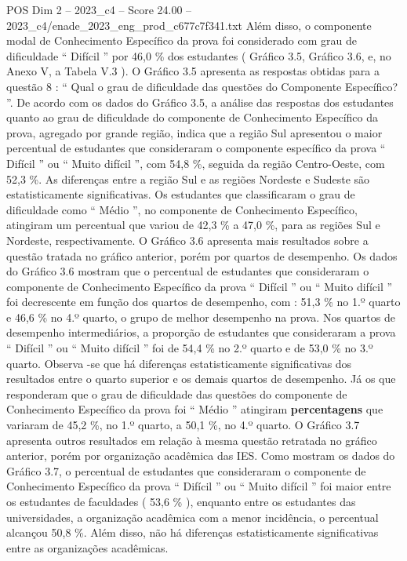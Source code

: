 \begin{textsample}{POS Dim 2 – 2023\_c4 – Score 24.00 – 2023\_c4/enade\_2023\_eng\_prod\_c677c7f341.txt}
Além disso, o componente modal de Conhecimento Específico da prova foi considerado com grau de dificuldade “ Difícil ” por 46,0 \% dos estudantes ( Gráfico 3.5, Gráfico 3.6, e, no Anexo V, a Tabela V.3 ).
O Gráfico 3.5 apresenta as respostas obtidas para a questão 8 : “ Qual o grau de dificuldade das questões do Componente Específico? ”.
De acordo com os dados do Gráfico 3.5, a análise das respostas dos estudantes quanto ao grau de dificuldade do componente de Conhecimento Específico da prova, agregado por grande região, indica que a região Sul apresentou o maior percentual de estudantes que consideraram o componente específico da prova “ Difícil ” ou “ Muito difícil ”, com 54,8 \%, seguida da região Centro-Oeste, com 52,3 \%.
As diferenças entre a região Sul e as regiões Nordeste e Sudeste são estatisticamente significativas.
Os estudantes que classificaram o grau de dificuldade como “ Médio ”, no componente de Conhecimento Específico, atingiram um percentual que variou de 42,3 \% a 47,0 \%, para as regiões Sul e Nordeste, respectivamente.
O Gráfico 3.6 apresenta mais resultados sobre a questão tratada no gráfico anterior, porém por quartos de desempenho.
Os dados do Gráfico 3.6 mostram que o percentual de estudantes que consideraram o componente de Conhecimento Específico da prova “ Difícil ” ou “ Muito difícil ” foi decrescente em função dos quartos de desempenho, com : 51,3 \% no 1.º quarto e 46,6 \% no 4.º quarto, o grupo de melhor desempenho na prova.
Nos quartos de desempenho intermediários, a proporção de estudantes que consideraram a prova “ Difícil ” ou “ Muito difícil ” foi de 54,4 \% no 2.º quarto e de 53,0 \% no 3.º quarto.
Observa -se que há diferenças estatisticamente significativas dos resultados entre o quarto superior e os demais quartos de desempenho.
Já os que responderam que o grau de dificuldade das questões do componente de Conhecimento Específico da prova foi “ Médio ” atingiram \textbf{percentagens} que variaram de 45,2 \%, no 1.º quarto, a 50,1 \%, no 4.º quarto.
O Gráfico 3.7 apresenta outros resultados em relação à mesma questão retratada no gráfico anterior, porém por organização acadêmica das IES.
Como mostram os dados do Gráfico 3.7, o percentual de estudantes que consideraram o componente de Conhecimento Específico da prova “ Difícil ” ou “ Muito difícil ” foi maior entre os estudantes de faculdades ( 53,6 \% ), enquanto entre os estudantes das universidades, a organização acadêmica com a menor incidência, o percentual alcançou 50,8 \%.
Além disso, não há diferenças estatisticamente significativas entre as organizações acadêmicas.

\end{textsample}
